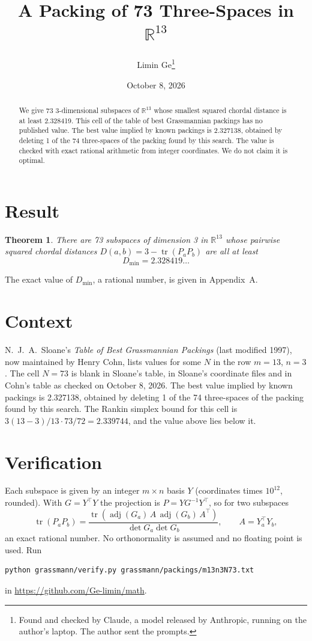 \documentclass[11pt,a4paper]{article}
\title{A Packing of 73 Three-Spaces in $\mathbb{R}^{13}$}
\author{Limin Ge\thanks{Found and checked by Claude, a model released by Anthropic, running on the author's laptop. The author sent the prompts.}}
\date{October 8, 2026}
\newtheorem*{theorem}{Theorem}
\begin{document}
\maketitle
\begin{abstract}
We give 73 3-dimensional subspaces of $\mathbb{R}^{13}$ whose smallest squared chordal distance is at least 2.328419. This cell of the table of best Grassmannian packings has no published value. The best value implied by known packings is 2.327138, obtained by deleting 1 of the 74 three-spaces of the packing found by this search. The value is checked with exact rational arithmetic from integer coordinates. We do not claim it is optimal.
\end{abstract}

\section{Result}
\begin{theorem}
There are 73 subspaces of dimension 3 in $\mathbb{R}^{13}$ whose pairwise squared chordal distances $D(a,b) = 3 - \operatorname{tr}(P_aP_b)$ are all at least
\[ D_{\min} = 2.328419\ldots \]
\end{theorem}
The exact value of $D_{\min}$, a rational number, is given in Appendix~A.


\section{Context}
N.~J.~A.~Sloane's \emph{Table of Best Grassmannian Packings} (last modified 1997), now maintained by Henry Cohn, lists values for some $N$ in the row $m=13$, $n=3$. The cell $N=73$ is blank in Sloane's table, in Sloane's coordinate files and in Cohn's table as checked on October 8, 2026. The best value implied by known packings is 2.327138, obtained by deleting 1 of the 74 three-spaces of the packing found by this search. The Rankin simplex bound for this cell is $3(13-3)/13\cdot 73/72 = 2.339744$, and the value above lies below it.


\section{Verification}
Each subspace is given by an integer $m\times n$ basis $Y$ (coordinates times $10^{12}$, rounded). With $G=Y^\top Y$ the projection is $P=YG^{-1}Y^\top$, so for two subspaces
\[ \operatorname{tr}(P_aP_b)=\frac{\operatorname{tr}(\operatorname{adj}(G_a)\,A\,\operatorname{adj}(G_b)\,A^\top)}{\det G_a\det G_b},\qquad A=Y_a^\top Y_b, \]
an exact rational number. No orthonormality is assumed and no floating point is used. Run
\begin{verbatim}
python grassmann/verify.py grassmann/packings/m13n3N73.txt
\end{verbatim}
in \url{https://github.com/Ge-limin/math}.
\end{document}
